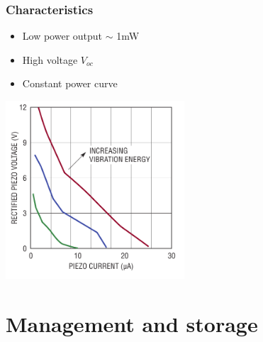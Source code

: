 \documentclass{beamer}
\begin{document}
\begin{frame}
  \frametitle{Characteristics}
\begin{itemize}
  \item Low power output $\sim$ 1mW
  \item High voltage $V_{oc}$
  \item Constant power curve
\end{itemize}

\begin{center}
\includegraphics[width=0.5\textwidth]{./Slike/Piezo-UI}
\end{center}
  
\end{frame}

\section{Management and storage}
\end{document}
